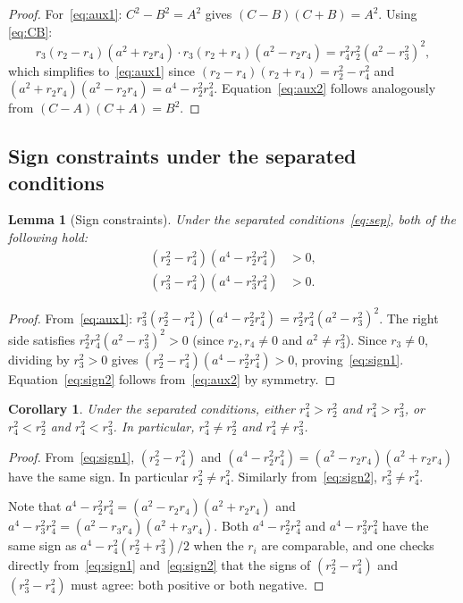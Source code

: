 \documentclass[12pt, a4paper]{article}
\newtheorem{lemma}[theorem]{Lemma}
\newtheorem{corollary}[theorem]{Corollary}
\theoremstyle{definition}
\begin{document}
\begin{proof}
  For~\eqref{eq:aux1}: $C^2-B^2 = A^2$ gives $(C-B)(C+B) = A^2$.  Using
  \eqref{eq:CB}:
  \[
    r_3(r_2-r_4)(a^2+r_2r_4) \cdot r_3(r_2+r_4)(a^2-r_2r_4) = r_4^2r_2^2(a^2-r_3^2)^2,
  \]
  which simplifies to~\eqref{eq:aux1} since
  $(r_2-r_4)(r_2+r_4)=r_2^2-r_4^2$ and $(a^2+r_2r_4)(a^2-r_2r_4)=a^4-r_2^2r_4^2$.
  Equation~\eqref{eq:aux2} follows analogously from $(C-A)(C+A)=B^2$.
\end{proof}

\subsection{Sign constraints under the separated conditions}

\begin{lemma}[Sign constraints]\label{lem:sign}
  Under the separated conditions~\eqref{eq:sep}, both of the following hold:
  \begin{align}
    (r_2^2-r_4^2)(a^4-r_2^2r_4^2) &> 0, \label{eq:sign1}\\
    (r_3^2-r_4^2)(a^4-r_3^2r_4^2) &> 0. \label{eq:sign2}
  \end{align}
\end{lemma}

\begin{proof}
  From~\eqref{eq:aux1}: $r_3^2(r_2^2-r_4^2)(a^4-r_2^2r_4^2) = r_2^2r_4^2(a^2-r_3^2)^2$.
  The right side satisfies $r_2^2r_4^2(a^2-r_3^2)^2 > 0$ (since $r_2, r_4 \neq 0$ and
  $a^2 \neq r_3^2$).  Since $r_3 \neq 0$, dividing by $r_3^2 > 0$ gives
  $(r_2^2-r_4^2)(a^4-r_2^2r_4^2) > 0$, proving~\eqref{eq:sign1}.
  Equation~\eqref{eq:sign2} follows from~\eqref{eq:aux2} by symmetry.
\end{proof}

\begin{corollary}\label{cor:size}
  Under the separated conditions, either $r_4^2 > r_2^2$ and $r_4^2 > r_3^2$,
  or $r_4^2 < r_2^2$ and $r_4^2 < r_3^2$.  In particular,
  $r_4^2 \neq r_2^2$ and $r_4^2 \neq r_3^2$.
\end{corollary}

\begin{proof}
  From~\eqref{eq:sign1}, $(r_2^2-r_4^2)$ and $(a^4-r_2^2r_4^2) = (a^2-r_2r_4)(a^2+r_2r_4)$
  have the same sign.  In particular $r_2^2 \neq r_4^2$.  Similarly
  from~\eqref{eq:sign2}, $r_3^2 \neq r_4^2$.

  Note that $a^4-r_2^2r_4^2 = (a^2-r_2r_4)(a^2+r_2r_4)$ and
  $a^4-r_3^2r_4^2 = (a^2-r_3r_4)(a^2+r_3r_4)$.  Both $a^4-r_2^2r_4^2$ and
  $a^4-r_3^2r_4^2$ have the same sign as $a^4-r_4^2(r_2^2+r_3^2)/2$ when the
  $r_i$ are comparable, and one checks directly from~\eqref{eq:sign1}
  and~\eqref{eq:sign2} that the signs of $(r_2^2-r_4^2)$ and $(r_3^2-r_4^2)$
  must agree: both positive or both negative.
\end{proof}
\end{document}
